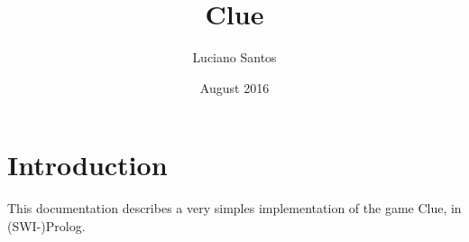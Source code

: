 \documentclass[a4]{article}
\title{Clue}
\author{Luciano Santos}
\date{August 2016}
\begin{document}
\maketitle

\section{Introduction}

This documentation describes a very simples implementation of the game Clue, in (SWI-)Prolog.
\end{document}
